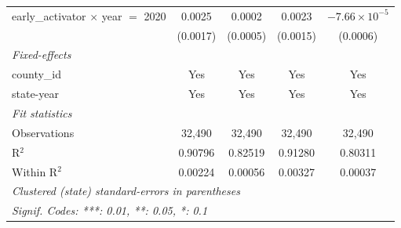 \begin{tabular}{lcccc}
   early\_activator $\times$ year $=$ 2020   & 0.0025             & 0.0002                    & 0.0023               & $-7.66\times 10^{-5}$\\    
                                             & (0.0017)           & (0.0005)                  & (0.0015)             & (0.0006)\\   
   \midrule
   \emph{Fixed-effects}\\
   county\_id                                & Yes                & Yes                       & Yes                  & Yes\\  
   state-year                                & Yes                & Yes                       & Yes                  & Yes\\  
   \midrule
   \emph{Fit statistics}\\
   Observations                              & 32,490             & 32,490                    & 32,490               & 32,490\\  
   R$^2$                                     & 0.90796            & 0.82519                   & 0.91280              & 0.80311\\  
   Within R$^2$                              & 0.00224            & 0.00056                   & 0.00327              & 0.00037\\  
   \midrule \midrule
   \multicolumn{5}{l}{\emph{Clustered (state) standard-errors in parentheses}}\\
   \multicolumn{5}{l}{\emph{Signif. Codes: ***: 0.01, **: 0.05, *: 0.1}}\\
\end{tabular}
\par\endgroup


